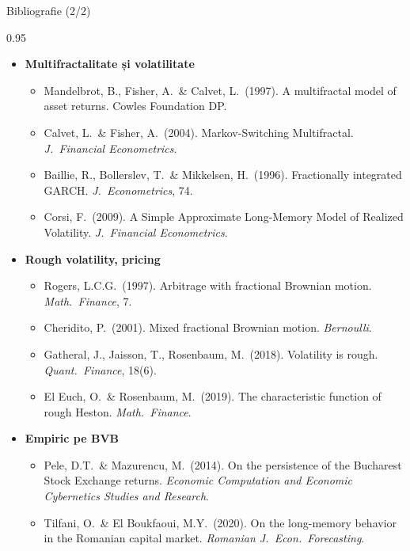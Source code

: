 \documentclass[9pt, aspectratio=169, t]{beamer}
\begin{document}
\begin{frame}[shrink=15]{Bibliografie (2/2)}
\begin{cminipage}{0.95\textwidth}
\begin{itemize}\setlength{\itemsep}{0pt}
    \item \textbf{Multifractalitate și volatilitate}
    \begin{itemize}\setlength{\itemsep}{0pt}
        \item Mandelbrot, B., Fisher, A.\ \& Calvet, L.\ (1997). A multifractal model of asset returns. Cowles Foundation DP.
        \item Calvet, L.\ \& Fisher, A.\ (2004). Markov-Switching Multifractal. \textit{J.\ Financial Econometrics}.
        \item Baillie, R., Bollerslev, T.\ \& Mikkelsen, H.\ (1996). Fractionally integrated GARCH. \textit{J.\ Econometrics}, 74.
        \item Corsi, F.\ (2009). A Simple Approximate Long-Memory Model of Realized Volatility. \textit{J.\ Financial Econometrics}.
    \end{itemize}
    \item \textbf{Rough volatility, pricing}
    \begin{itemize}\setlength{\itemsep}{0pt}
        \item Rogers, L.C.G.\ (1997). Arbitrage with fractional Brownian motion. \textit{Math.\ Finance}, 7.
        \item Cheridito, P.\ (2001). Mixed fractional Brownian motion. \textit{Bernoulli}.
        \item Gatheral, J., Jaisson, T., Rosenbaum, M.\ (2018). Volatility is rough. \textit{Quant.\ Finance}, 18(6).
        \item El Euch, O.\ \& Rosenbaum, M.\ (2019). The characteristic function of rough Heston. \textit{Math.\ Finance}.
    \end{itemize}
    \item \textbf{Empiric pe BVB}
    \begin{itemize}\setlength{\itemsep}{0pt}
        \item Pele, D.T.\ \& Mazurencu, M.\ (2014). On the persistence of the Bucharest Stock Exchange returns. \textit{Economic Computation and Economic Cybernetics Studies and Research}.
        \item Tilfani, O.\ \& El Boukfaoui, M.Y.\ (2020). On the long-memory behavior in the Romanian capital market. \textit{Romanian J.\ Econ.\ Forecasting}.
    \end{itemize}
\end{itemize}
\end{cminipage}
\end{frame}
\end{document}
